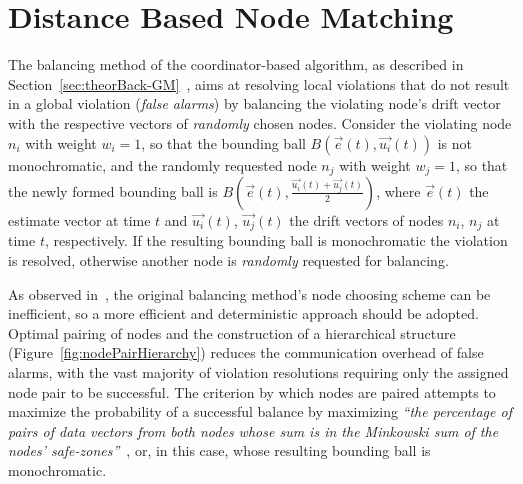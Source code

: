 \section{Distance Based Node Matching} \label{sec:impl-distNodeMatch}

The balancing method of the coordinator-based algorithm, as described in Section~\ref{sec:theorBack-GM}~\cite{Sharfman2006GM, Sharfman2012ShapeSensGM}, aims at resolving local violations that do not result in a global violation (\emph{false alarms}) by balancing the violating node's drift vector with the respective vectors of \emph{randomly} chosen nodes. Consider the violating node $n_i$ with weight $w_i=1$, so that the bounding ball $B(\vec{e}(t), \vec{u_i}(t))$ is not monochromatic, and the randomly requested node $n_j$ with weight $w_j=1$, so that the newly formed bounding ball is $B(\vec{e}(t), \frac{\vec{u_i}(t)+\vec{u_j}(t)}{2})$, where $\vec{e}(t)$ the estimate vector at time $t$ and $\vec{u_i}(t)$, $\vec{u_j}(t)$ the drift vectors of nodes $n_i$, $n_j$ at time $t$, respectively. If the resulting bounding ball is monochromatic the violation is resolved, otherwise another node is \emph{randomly} requested for balancing.

As observed in~\cite{Keren2014GMHetStreams}, the original balancing method's node choosing scheme can be inefficient, so a more efficient and deterministic approach should be adopted. Optimal pairing of nodes and the construction of a hierarchical structure (Figure~\ref{fig:nodePairHierarchy}) reduces the communication overhead of false alarms, with the vast majority of violation resolutions requiring only the assigned node pair to be successful. The criterion by which nodes are paired attempts to maximize the probability of a successful balance by maximizing \textit{``the percentage of pairs of data vectors from both nodes whose sum is in the Minkowski sum of the nodes' safe-zones''}~\cite{Keren2014GMHetStreams}, or, in this case, whose resulting bounding ball is monochromatic.

